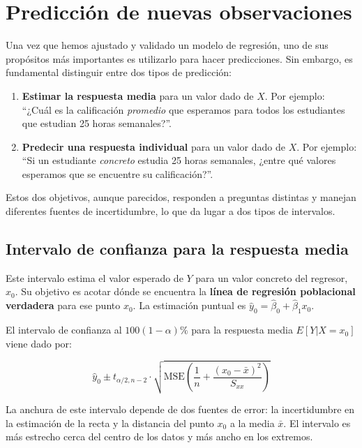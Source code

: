 \documentclass[
  letterpaper,
  DIV=11,
  numbers=noendperiod]{scrreprt}
\providecommand{\tightlist}{%
  \setlength{\itemsep}{0pt}\setlength{\parskip}{0pt}}
\begin{document}
\section{Predicción de nuevas
observaciones}\label{predicciuxf3n-de-nuevas-observaciones}

Una vez que hemos ajustado y validado un modelo de regresión, uno de sus
propósitos más importantes es utilizarlo para hacer predicciones. Sin
embargo, es fundamental distinguir entre dos tipos de predicción:

\begin{enumerate}
\def\labelenumi{\arabic{enumi}.}
\tightlist
\item
  \textbf{Estimar la respuesta media} para un valor dado de \(X\). Por
  ejemplo: ``¿Cuál es la calificación \emph{promedio} que esperamos para
  todos los estudiantes que estudian 25 horas semanales?''.
\item
  \textbf{Predecir una respuesta individual} para un valor dado de
  \(X\). Por ejemplo: ``Si un estudiante \emph{concreto} estudia 25
  horas semanales, ¿entre qué valores esperamos que se encuentre su
  calificación?''.
\end{enumerate}

Estos dos objetivos, aunque parecidos, responden a preguntas distintas y
manejan diferentes fuentes de incertidumbre, lo que da lugar a dos tipos
de intervalos.

\subsection{Intervalo de confianza para la respuesta
media}\label{intervalo-de-confianza-para-la-respuesta-media}

Este intervalo estima el valor esperado de \(Y\) para un valor concreto
del regresor, \(x_0\). Su objetivo es acotar dónde se encuentra la
\textbf{línea de regresión poblacional verdadera} para ese punto
\(x_0\). La estimación puntual es
\(\hat{y}_0 = \hat{\beta}_0 + \hat{\beta}_1 x_0\).

El intervalo de confianza al \(100(1-\alpha)\%\) para la respuesta media
\(E[Y|X=x_0]\) viene dado por:

\[
\hat{y}_0 \pm t_{\alpha/2, n-2} \cdot \sqrt{\text{MSE} \left( \frac{1}{n} + \frac{(x_0 - \bar{x})^2}{S_{xx}} \right)}
\]

La anchura de este intervalo depende de dos fuentes de error: la
incertidumbre en la estimación de la recta y la distancia del punto
\(x_0\) a la media \(\bar{x}\). El intervalo es más estrecho cerca del
centro de los datos y más ancho en los extremos.
\end{document}
